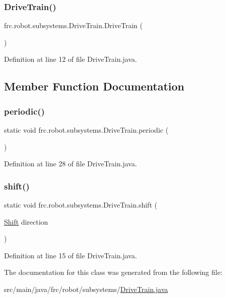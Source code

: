 \subsubsection{\texorpdfstring{Drive\+Train()}{DriveTrain()}}
{\footnotesize\ttfamily frc.\+robot.\+subsystems.\+Drive\+Train.\+Drive\+Train (\begin{DoxyParamCaption}{ }\end{DoxyParamCaption})}



Definition at line 12 of file Drive\+Train.\+java.



\subsection{Member Function Documentation}
\mbox{\label{classfrc_1_1robot_1_1subsystems_1_1_drive_train_a883baac3715e22887c0ec5ce825fbfab}} 
\subsubsection{\texorpdfstring{periodic()}{periodic()}}
{\footnotesize\ttfamily static void frc.\+robot.\+subsystems.\+Drive\+Train.\+periodic (\begin{DoxyParamCaption}{ }\end{DoxyParamCaption})\hspace{0.3cm}{\ttfamily [static]}}



Definition at line 28 of file Drive\+Train.\+java.

\mbox{\label{classfrc_1_1robot_1_1subsystems_1_1_drive_train_a3288b5af8182d08f76290b257041538c}} 
\subsubsection{\texorpdfstring{shift()}{shift()}}
{\footnotesize\ttfamily static void frc.\+robot.\+subsystems.\+Drive\+Train.\+shift (\begin{DoxyParamCaption}\item[{\hyperlink{enumfrc_1_1robot_1_1_enums_1_1_shift}{Shift}}]{direction }\end{DoxyParamCaption})\hspace{0.3cm}{\ttfamily [static]}}



Definition at line 15 of file Drive\+Train.\+java.



The documentation for this class was generated from the following file\+:\begin{DoxyCompactItemize}
\item 
src/main/java/frc/robot/subsystems/\hyperlink{_drive_train_8java}{Drive\+Train.\+java}\end{DoxyCompactItemize}
